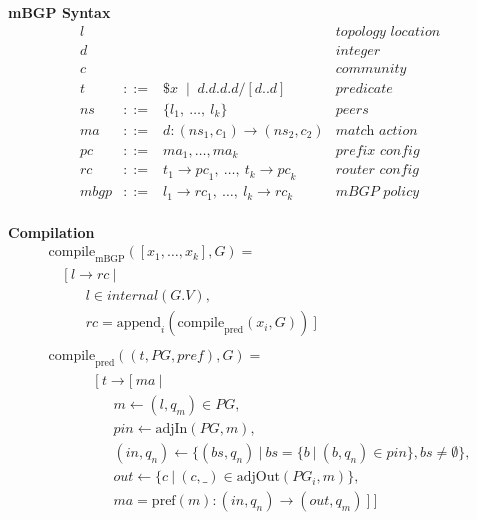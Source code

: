 \documentclass[twocolumn, openany]{sig-alternate-10pt}
\newcommand{\CompilePred}{\ensuremath{\mathrm{compile}_\mathrm{pred}}}
\newcommand{\CompileMbgp}{\ensuremath{\mathrm{compile}_\mathrm{mBGP}}}
\newcommand{\Append}{\ensuremath{\mathrm{append}}}
\newcommand{\Pref}{\ensuremath{\mathrm{pref}}}
\newcommand{\BNFALT}{\;\;|\;\;}
\newcommand{\hdr}[2]{\flushleft \chdr{\hspace{5mm}#1}{#2}}
\newcommand{\chdr}[2]{\textbf{#1} {#2} \\ \centering}%
\begin{document}
\begin{figure*}[h!]
  \vspace{1em}
  \begin{minipage}[t]{.46\linewidth}
  \hdr{mBGP Syntax}{}
  \vspace*{-1\baselineskip}
  \[ \begin{array}{rclr}
     l    &   & & \textit{topology location} \\
     d    &   & & \textit{integer} \\
     c    &   & & \textit{community} \\
     t    &::=& \$x \BNFALT d.d.d.d/[d..d] & \textit{predicate} \\
     ns   &::=& \{ l_1, ~\dots,~ l_k \} & \textit{peers} \\
     ma   &::=& d : ({ns}_1, c_1) \rightarrow ({ns}_2, c_2) & \textit{match action} \\
     pc   &::=& ma_1, \dots, ma_k & \textit{prefix config} \\
     rc   &::=& t_1 \rightarrow {pc}_1, ~\dots,~ t_k \rightarrow {pc}_k & \textit{router config} \\
     mbgp &::=& l_1 \rightarrow {rc}_1, ~\dots,~ l_k \rightarrow {rc}_k & \textit{mBGP policy} \\%
  \end{array} \]%

  \end{minipage}
  \begin{minipage}[t]{.5\linewidth}
  \hdr{Compilation}{}
  \vspace*{-1\baselineskip}
  \[ \begin{array}{l}
     \CompileMbgp( [x_1, \dots, x_k], G ) = \\
     ~~~~~ [~ l \rightarrow rc ~\vert~ \\
     ~~~~~~~~~~~~ l \in internal(G.V), \\
     ~~~~~~~~~~~~ rc = \Append_i (\CompilePred( x_i, G )) ~]  \\
     \\
     \CompilePred( (t,PG,pref), G ) = \\
     ~~~~~~~~~~~~~~~ [~ t \rightarrow [~ ma ~\vert~ \\
     ~~~~~~~~~~~~~~~~~~~~~ m \leftarrow (l,q_m) \in PG, \\
     ~~~~~~~~~~~~~~~~~~~~~ pin \leftarrow \text{adjIn}(PG,m), \\
     ~~~~~~~~~~~~~~~~~~~~~ (in,q_n) \leftarrow \{ (bs,q_n) ~\vert~ bs=\{b ~\vert~ (b,q_n) \in pin \}, bs \neq \emptyset \}, \\
     ~~~~~~~~~~~~~~~~~~~~~ out \leftarrow \{ c ~\vert~ (c,\_) \in \text{adjOut}(PG_i,m) \}, \\
     ~~~~~~~~~~~~~~~~~~~~~ ma = \Pref(m) : (in,q_n) \rightarrow (out,q_m) ~] ~] \\
     \\



\end{array}\]
\end{minipage}
\end{figure*}
\end{document}

